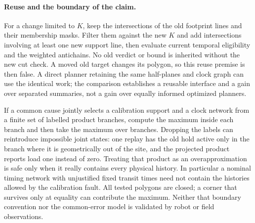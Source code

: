 \documentclass[11pt]{article}
\begin{document}
\paragraph{Reuse and the boundary of the claim.}
For a change limited to $K$, keep the intersections of the old footprint
lines and their membership masks. Filter them against the new $K$ and
add intersections involving at least one new support line, then evaluate
current temporal eligibility and the weighted antichains. No old
verdict or bound is inherited without the new cut check. A moved old
target changes its polygon, so this reuse premise is then false.
A direct planner retaining the same half-planes and clock graph can use
the identical work; the comparison establishes a reusable interface and
a gain over separated summaries, not a gain over equally informed
optimized planners.

If a common cause jointly selects a calibration support and a clock
network from a finite set of labelled product branches, compute the
maximum inside each branch and then take the maximum over branches.
Dropping the labels can reintroduce impossible joint states: one replay
has the old hold active only in the branch where it is geometrically
out of the site, and the projected product reports load one instead of
zero. Treating that product as an overapproximation is safe only when
it really contains every physical history. In particular a nominal
timing network with unjustified fixed transit times need not contain
the histories allowed by the calibration fault. All tested polygons
are closed; a corner that survives only at equality can contribute the
maximum. Neither that boundary convention nor the common-error model is
validated by robot or field observations.
\end{document}
